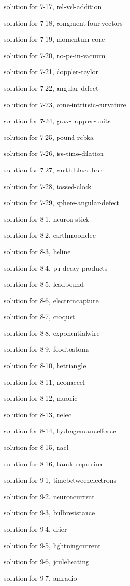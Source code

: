 \documentclass{problems}
\begin{document}
solution for 7-17, rel-vel-addition

solution for 7-18, congruent-four-vectors

solution for 7-19, momentum-cone

solution for 7-20, no-pe-in-vacuum

solution for 7-21, doppler-taylor

solution for 7-22, angular-defect

solution for 7-23, cone-intrinsic-curvature

solution for 7-24, grav-doppler-units

solution for 7-25, pound-rebka

solution for 7-26, iss-time-dilation

solution for 7-27, earth-black-hole

solution for 7-28, tossed-clock

solution for 7-29, sphere-angular-defect

solution for 8-1, neuron-stick

solution for 8-2, earthmoonelec

solution for 8-3, heline

solution for 8-4, pu-decay-products

solution for 8-5, leadbound

solution for 8-6, electroncapture

solution for 8-7, croquet

solution for 8-8, exponentialwire

solution for 8-9, foodtoatoms

solution for 8-10, hetriangle

solution for 8-11, neonaccel

solution for 8-12, muonic

solution for 8-13, uelec

solution for 8-14, hydrogencancelforce

solution for 8-15, nacl

solution for 8-16, hands-repulsion

solution for 9-1, timebetweenelectrons

solution for 9-2, neuroncurrent

solution for 9-3, bulbresistance

solution for 9-4, drier

solution for 9-5, lightningcurrent

solution for 9-6, jouleheating

solution for 9-7, amradio
\end{document}
